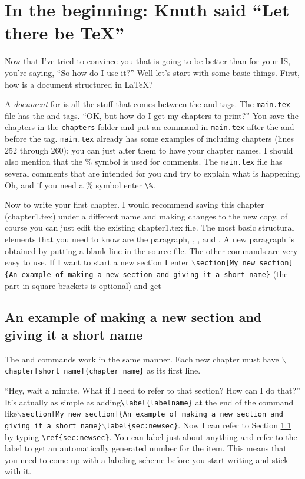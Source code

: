 \chapter{In the beginning: Knuth said ``Let there be \TeX''}\label{teX}
Now that I've tried to convince you that \lt is going to be better than \msw for your IS, you're saying, ``So how do I use it?'' Well let's start with some basic things. First, how is a document structured in \LaTeX?

A \emph{document} for \lt is all the stuff that comes between the \verb|| and \verb|| tags. The \verb|main.tex| file has the \verb|| and \verb|| tags. ``OK, but how do I get my chapters to print?'' You save the chapters in the \verb|chapters| folder and put an \verb|| command in \verb|main.tex| after the \verb|| and before the
\verb|| tag. \verb|main.tex| already has some examples of including chapters (lines 252 through 260); you can just alter them to have your chapter names. I should also mention that the \% symbol is used for comments. The \verb|main.tex| file has several comments that are intended for you and try to explain what is happening. Oh, and if you need a \% symbol enter \verb+\%+.

Now to write your first chapter. I would recommend saving this chapter (chapter1.tex) under a different name and making changes to the new copy, of course you can just edit the existing chapter1.tex file. The most basic structural elements that you need to know are the paragraph, , , and . A new paragraph is obtained by putting a blank line in the source file.  The other commands are very easy to use. If I want to start a new section I enter \texttt{$\backslash$section[My new section]\{An example of making a new section and giving it a short name\}} (the part in square brackets is optional) and get

\section[My new section]{An example of making a new section and giving it a short name}\label{sec:newsec}

The  and  commands work in the same manner. Each new chapter must have \texttt{$\backslash$chapter[short name]\{chapter name\}} as its first line.

``Hey, wait a minute. What if I need to refer to that section? How can I do that?'' It's actually as simple as adding\verb+\label{labelname}+ at the end of the  command like\texttt{$\backslash$section[My new section]\{An example of making a new section and giving it a short name\}$\backslash$label\{sec:newsec\}}. Now I can refer to Section \ref{sec:newsec} by typing \verb+\ref{sec:newsec}+. You can label just about anything and refer to the label to get an automatically generated number for the item. This means that you need to come up with a labeling scheme before you start writing and stick with it.

